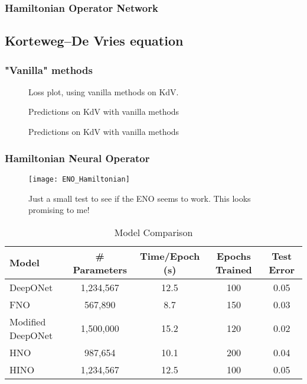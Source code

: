 \subsubsection{Hamiltonian Operator Network}

\subsection{Korteweg–De Vries equation}

\subsubsection{"Vanilla" methods}

\begin{figure*}[h!]
    \centering
    
    \caption[Loss plot, using vanilla methods on KdV]{Loss plot, using vanilla methods on KdV.}
    \label{fig:loss_plot_kdv}
\end{figure*}

\begin{figure*}[h!]
    
    \caption[Predictions on KdV with vanilla methods]{Predictions on KdV with vanilla methods}
    \label{fig:pred_kdv_vanilla}
\end{figure*}

\begin{figure*}[h!]
    
    \caption[Predictions on KdV with vanilla methods]{Predictions on KdV with vanilla methods}
    \label{fig:pred_kdv_vanilla_imshow}
\end{figure*}

\subsubsection{Hamiltonian Neural Operator}

\begin{figure}[h!]
    \texttt{[image: ENO\_Hamiltonian]}
    \caption[ENO Hamiltonian]{Just a small test to see if the ENO seems to work. This looks promising to me!}
    \label{fig:ENO_Hamiltonian}
\end{figure}

\begin{table}[h]
    \centering
    \caption{Model Comparison}
    \begin{tabular}{@{}lcccc@{}}
    \toprule
    Model & \# Parameters & Time/Epoch (s) & Epochs Trained & Test Error \\
    \midrule
    DeepONet & 1,234,567 & 12.5 & 100 & 0.05 \\
    FNO & 567,890 & 8.7 & 150 & 0.03 \\
    Modified DeepONet & 1,500,000 & 15.2 & 120 & 0.02 \\ 
    HNO & 987,654 & 10.1 & 200 & 0.04 \\
    HINO & 1,234,567 & 12.5 & 100 & 0.05 \\
    \bottomrule
    \end{tabular}
    \label{tab:model_comparison}
\end{table}